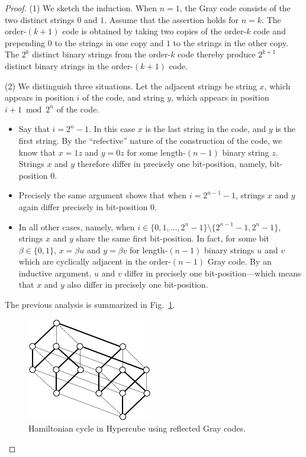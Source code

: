 \begin{proof}
(1) We sketch the induction.  When $n=1$, the Gray code consists of
the two distinct strings $0$ and $1$.  Assume that the assertion holds
for $n=k$.  The order-$(k+1)$ code is obtained by taking two copies of
the order-$k$ code and prepending $0$ to the strings in one copy and
$1$ to the strings in the other copy.  The $2^k$ distinct binary
strings from the order-$k$ code thereby produce $2^{k+1}$ distinct
binary strings in the order-$(k+1)$ code.

(2) We distinguish three situations.  Let the adjacent strings be
string $x$, which appears in position $i$ of the code, and string $y$,
which appears in position $i+1 \bmod 2^n$ of the code.
  \begin{itemize}
  \item
Say that $i = 2^n-1$.  In this case $x$ is the last string in the
code, and $y$ is the first string.  By the ``refective'' nature of the
construction of the code, we know that $x = 1z$ and $y = 0z$ for some
length-$(n-1)$ binary string $z$.  Strings $x$ and $y$ therefore
differ in precisely one bit-position, namely, bit-position $0$.

  \item
Precisely the same argument shows that when $i = 2^{n-1} -1$, strings
$x$ and $y$ again differ precisely in bit-position $0$.

  \item
In all other cases, namely, when $i \in \{0,1, \ldots, 2^n-1\}
\setminus \{2^{n-1} -1, 2^n-1\}$, strings $x$ and $y$ share the same
first bit-position.  In fact, for some bit $\beta \in \{0,1\}$, $x =
\beta u$ and $y = \beta v$ for length-$(n-1)$ binary strings $u$ and
$v$ which are cyclically adjacent in the order-$(n-1)$ Gray code.  By
an inductive argument, $u$ and $v$ differ in precisely one
bit-position---which means that $x$ and $y$ also differ in precisely
one bit-position.
  \end{itemize}
  The previous analysis is summarized in Fig.~\ref{fig:HamiltonHypercude}.
  \begin{figure}[hbt]
\begin{center}
       \includegraphics[scale=0.6]{FiguresGraph/HamiltonHypercube}
       \caption{Hamiltonian cycle in Hypercube using reflected Gray codes.}
  \label{fig:HamiltonHypercude}
\end{center}
\end{figure}



\end{proof}

